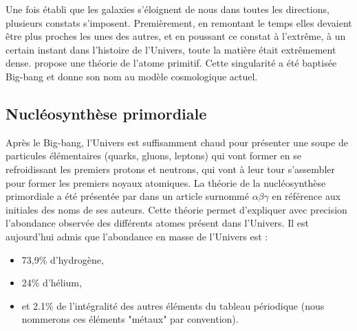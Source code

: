 Une fois établi que les galaxies s'éloignent de nous dans toutes les directions, plusieurs constats s'imposent.
Premièrement, en remontant le temps elles devaient être plus proches les unes des autres, et en poussant ce constat à l’extrême, à un certain instant dans l'histoire de l'Univers, toute la matière était extrêmement dense.
\cite{1927ASSB...47...49L} propose une théorie de l'atome primitif.
Cette singularité a été baptisée Big-bang et donne son nom au modèle cosmologique actuel.

%

\subsection{Nucléosynthèse primordiale}
\label{sec:nucleosynthese_primordiale}
Après le Big-bang, l'Univers est suffisamment chaud pour présenter une soupe de particules élémentaires (quarks, gluons, leptons) qui vont former en se refroidissant les premiers protons et neutrons, qui vont à leur tour s'assembler pour former les premiers noyaux atomiques.
La théorie de la nucléosynthèse primordiale a été présentée par \citep{PhysRev.73.803} dans un article surnommé $\alpha \beta \gamma$ en référence aux initiales des noms de ses auteurs.
Cette théorie permet d'expliquer avec precision l'abondance observée des différents atomes présent dans l'Univers.
Il est aujourd'hui admis que l'abondance en masse de l'Univers est : 

\begin{itemize}
\item 73,9\% d’hydrogène,
\item 24\% d’hélium,
\item et 2.1\% de l'intégralité des autres éléments du tableau périodique (nous nommerons ces éléments "métaux" par convention).
\end{itemize}

